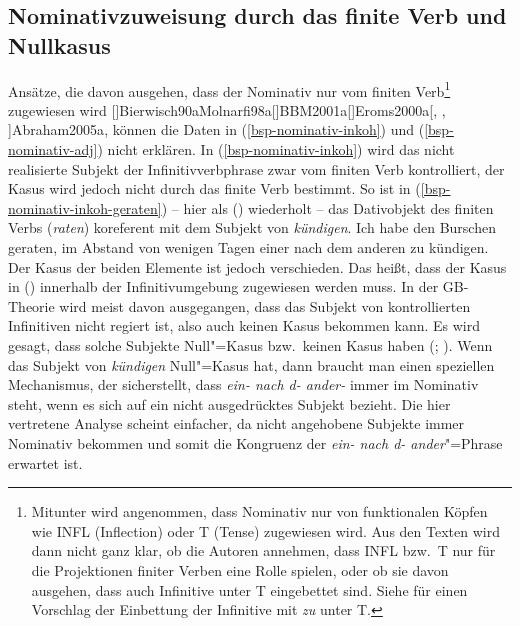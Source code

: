 \subsection{Nominativzuweisung durch das finite Verb und Nullkasus}
\label{sec-kasus-fin-verb-nullkasus}

Ansätze, die davon ausgehen, dass der Nominativ nur vom finiten Verb\footnote{
  Mitunter wird angenommen, dass Nominativ nur von funktionalen Köpfen wie INFL (Inflection) oder T (Tense) zugewiesen
  wird. Aus den Texten wird dann nicht ganz klar, ob die Autoren annehmen, dass INFL bzw.\ T nur für
  die Projektionen finiter Verben eine Rolle spielen, oder ob sie davon ausgehen, dass auch
  Infinitive unter T eingebettet sind. Siehe \citet[]{Wurmbrand2003a} für einen Vorschlag der Einbettung
  der Infinitive mit \emph{zu} unter T.%
} zugewiesen wird
%
\parencites[]{Chomsky93a}[]{Haider84b}[]{FF87a}%
[]{Bierwisch90a}{Molnarfi98a}[]{BBM2001a}[]{Eroms2000a}[, , ]{Abraham2005a}, 
können die Daten in (\ref{bsp-nominativ-inkoh}) und (\ref{bsp-nominativ-adj}) nicht erklären.
In (\ref{bsp-nominativ-inkoh}) wird das nicht realisierte Subjekt der Infinitivverbphrase
zwar vom finiten Verb kontrolliert, der Kasus wird jedoch nicht durch das finite Verb
bestimmt. So ist \zb in (\ref{bsp-nominativ-inkoh-geraten}) -- hier als () wiederholt -- das Dativobjekt 
des finiten Verbs (\emph{raten}) koreferent mit dem Subjekt von \emph{kündigen}. 
\ea
Ich habe den Burschen geraten, im Abstand von wenigen Tagen einer nach dem anderen zu kündigen.
\z
Der Kasus der beiden Elemente ist jedoch verschieden. Das heißt, dass der Kasus in ()
innerhalb der Infinitivumgebung zugewiesen werden muss. In der GB-Theorie wird meist davon
ausgegangen, dass das Subjekt von kontrollierten Infinitiven nicht regiert ist, also auch
keinen Kasus bekommen kann. Es wird gesagt, dass solche Subjekte Null"=Kasus bzw.\ keinen Kasus
haben (\citealp[]{Grewendorf88a}; \citealp[]{Frey93a}).
Wenn das Subjekt von \emph{kündigen} Null"=Kasus hat,
dann braucht man einen speziellen Mechanismus, der sicherstellt,
dass \emph{ein- nach d- ander-} immer im Nominativ steht, wenn es sich auf ein nicht 
ausgedrücktes Subjekt bezieht. Die hier vertretene Analyse scheint einfacher,
da nicht angehobene Subjekte immer Nominativ bekommen und somit
die Kongruenz der \emph{ein- nach d- ander}"=Phrase erwartet ist.




